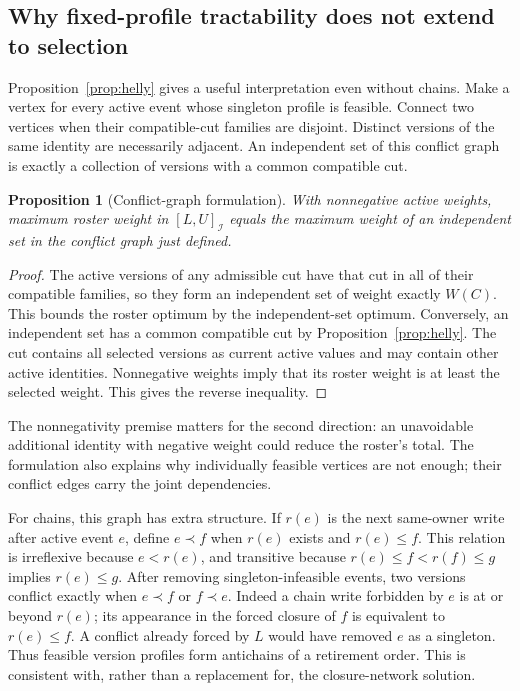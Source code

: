 \documentclass[11pt]{article}
\newtheorem{proposition}[theorem]{Proposition}
\theoremstyle{definition}
\newcommand{\Id}{\mathcal I}
\begin{document}
\subsection{Why fixed-profile tractability does not extend to selection}
Proposition~\ref{prop:helly} gives a useful interpretation even without chains. Make a vertex for every active event whose singleton profile is feasible. Connect two vertices when their compatible-cut families are disjoint. Distinct versions of the same identity are necessarily adjacent. An independent set of this conflict graph is exactly a collection of versions with a common compatible cut.

\begin{proposition}[Conflict-graph formulation]\label{prop:graph}
With nonnegative active weights, maximum roster weight in $[L,U]_{\Id}$ equals the maximum weight of an independent set in the conflict graph just defined.
\end{proposition}
\begin{proof}
The active versions of any admissible cut have that cut in all of their compatible families, so they form an independent set of weight exactly $W(C)$. This bounds the roster optimum by the independent-set optimum. Conversely, an independent set has a common compatible cut by Proposition~\ref{prop:helly}. The cut contains all selected versions as current active values and may contain other active identities. Nonnegative weights imply that its roster weight is at least the selected weight. This gives the reverse inequality.
\end{proof}

The nonnegativity premise matters for the second direction: an unavoidable additional identity with negative weight could reduce the roster's total. The formulation also explains why individually feasible vertices are not enough; their conflict edges carry the joint dependencies.

For chains, this graph has extra structure. If $r(e)$ is the next same-owner write after active event $e$, define $e\prec f$ when $r(e)$ exists and $r(e)\leq f$. This relation is irreflexive because $e<r(e)$, and transitive because $r(e)\leq f<r(f)\leq g$ implies $r(e)\leq g$. After removing singleton-infeasible events, two versions conflict exactly when $e\prec f$ or $f\prec e$. Indeed a chain write forbidden by $e$ is at or beyond $r(e)$; its appearance in the forced closure of $f$ is equivalent to $r(e)\leq f$. A conflict already forced by $L$ would have removed $e$ as a singleton. Thus feasible version profiles form antichains of a retirement order. This is consistent with, rather than a replacement for, the closure-network solution.
\end{document}

